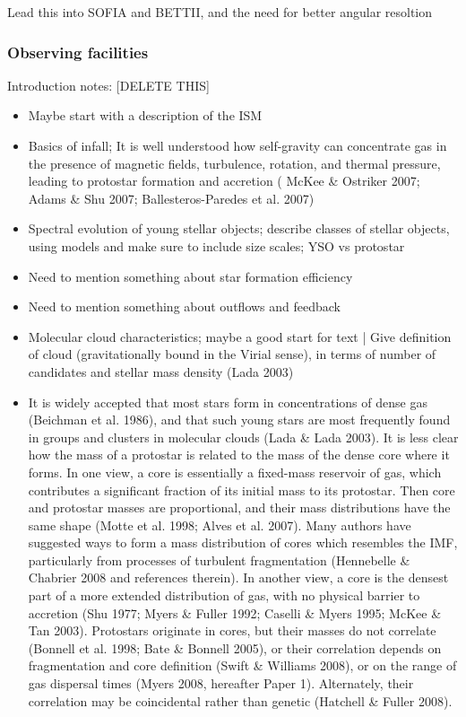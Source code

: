 Lead this into SOFIA and BETTII, and the need for better angular resoltion

\subsubsection{Observing facilities}

Introduction notes: [DELETE THIS]
\begin{itemize}
\item \citep{Kennicutt:2012ey} Maybe start with a description of the ISM
\item \citep{Terebey:1984hi} Basics of infall; 
It is well understood how self-gravity can concentrate gas in the presence of magnetic fields, turbulence, rotation, and thermal pressure, leading to protostar formation and accretion ( McKee \& Ostriker 2007; Adams \& Shu 2007; Ballesteros-Paredes et al. 2007)
\item \citep{Adams:1987gy} Spectral evolution of young stellar objects; describe classes of stellar objects, using models and make sure to include size scales; YSO vs protostar
\item Need to mention something about star formation efficiency
\item Need to mention something about outflows and feedback \citep{Maury:2009co}
\item \citep{Larson:1994cj} Molecular cloud characteristics; maybe a good start for text | Give definition of cloud (gravitationally bound in the Virial sense), in terms of number of candidates and stellar mass density (Lada 2003)
\item \citep{Myers:2009fv} It is widely accepted that most stars form in concentrations of dense gas (Beichman et al. 1986), and that such young stars are most frequently found in groups and clusters in molecular clouds (Lada \& Lada 2003). It is less clear how the mass of a protostar is related to the mass of the dense core where it forms.
In one view, a core is essentially a fixed-mass reservoir of gas, which contributes a significant fraction of its initial mass to its protostar. Then core and protostar masses are proportional, and their mass distributions have the same shape (Motte et al. 1998; Alves et al. 2007). Many authors have suggested ways to form a mass distribution of cores which resembles the IMF, particularly from processes of turbulent fragmentation (Hennebelle \& Chabrier 2008 and references therein).
In another view, a core is the densest part of a more extended distribution of gas, with no physical barrier to accretion (Shu 1977; Myers \& Fuller 1992; Caselli \& Myers 1995; McKee \& Tan 2003). Protostars originate in cores, but their masses do not correlate (Bonnell et al. 1998; Bate \& Bonnell 2005), or their correlation depends on fragmentation and core definition (Swift \& Williams 2008), or on the range of gas dispersal times (Myers 2008, hereafter Paper 1). Alternately, their correlation may be coincidental rather than genetic (Hatchell \& Fuller 2008).

\end{itemize}
